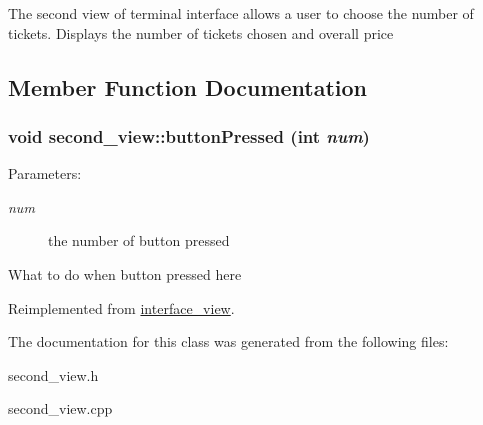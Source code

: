 The second view of terminal interface allows a user to choose the number of tickets. Displays the number of tickets chosen and overall price 

\subsection{Member Function Documentation}
\hypertarget{classsecond__view_46c6fdf7e691500a94adc9683ae5222e}{
\subsubsection[{buttonPressed}]{\setlength{\rightskip}{0pt plus 5cm}void second\_\-view::buttonPressed (int {\em num})}}
\label{classsecond__view_46c6fdf7e691500a94adc9683ae5222e}


\begin{Desc}
\item[Parameters:]
\begin{description}
\item[{\em num}]the number of button pressed\end{description}
\end{Desc}
What to do when button pressed here 

Reimplemented from \hyperlink{classinterface__view_2cbfdb9bdf8d47fd9a381df0bc67f434}{interface\_\-view}.

The documentation for this class was generated from the following files:\begin{CompactItemize}
\item 
second\_\-view.h\item 
second\_\-view.cpp\end{CompactItemize}
